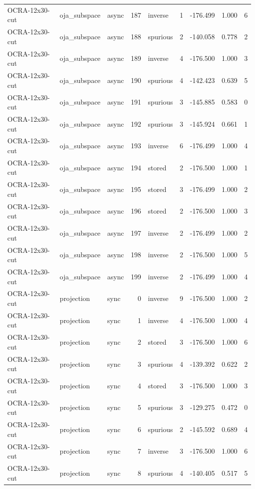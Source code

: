 \begin{tabular}{lllrlrrrr}
OCRA-12x30-cut & oja\_subspace & async & 187 & inverse & 1 & -176.499 & 1.000 & 6 \\
OCRA-12x30-cut & oja\_subspace & async & 188 & spurious & 2 & -140.058 & 0.778 & 2 \\
OCRA-12x30-cut & oja\_subspace & async & 189 & inverse & 4 & -176.500 & 1.000 & 3 \\
OCRA-12x30-cut & oja\_subspace & async & 190 & spurious & 4 & -142.423 & 0.639 & 5 \\
OCRA-12x30-cut & oja\_subspace & async & 191 & spurious & 3 & -145.885 & 0.583 & 0 \\
OCRA-12x30-cut & oja\_subspace & async & 192 & spurious & 3 & -145.924 & 0.661 & 1 \\
OCRA-12x30-cut & oja\_subspace & async & 193 & inverse & 6 & -176.499 & 1.000 & 4 \\
OCRA-12x30-cut & oja\_subspace & async & 194 & stored & 2 & -176.500 & 1.000 & 1 \\
OCRA-12x30-cut & oja\_subspace & async & 195 & stored & 3 & -176.499 & 1.000 & 2 \\
OCRA-12x30-cut & oja\_subspace & async & 196 & stored & 2 & -176.500 & 1.000 & 3 \\
OCRA-12x30-cut & oja\_subspace & async & 197 & inverse & 2 & -176.499 & 1.000 & 2 \\
OCRA-12x30-cut & oja\_subspace & async & 198 & inverse & 2 & -176.500 & 1.000 & 5 \\
OCRA-12x30-cut & oja\_subspace & async & 199 & inverse & 2 & -176.499 & 1.000 & 4 \\
OCRA-12x30-cut & projection & sync & 0 & inverse & 9 & -176.500 & 1.000 & 2 \\
OCRA-12x30-cut & projection & sync & 1 & inverse & 4 & -176.500 & 1.000 & 4 \\
OCRA-12x30-cut & projection & sync & 2 & stored & 3 & -176.500 & 1.000 & 6 \\
OCRA-12x30-cut & projection & sync & 3 & spurious & 4 & -139.392 & 0.622 & 2 \\
OCRA-12x30-cut & projection & sync & 4 & stored & 3 & -176.500 & 1.000 & 3 \\
OCRA-12x30-cut & projection & sync & 5 & spurious & 3 & -129.275 & 0.472 & 0 \\
OCRA-12x30-cut & projection & sync & 6 & spurious & 2 & -145.592 & 0.689 & 4 \\
OCRA-12x30-cut & projection & sync & 7 & inverse & 3 & -176.500 & 1.000 & 6 \\
OCRA-12x30-cut & projection & sync & 8 & spurious & 4 & -140.405 & 0.517 & 5 \\

\end{tabular}
